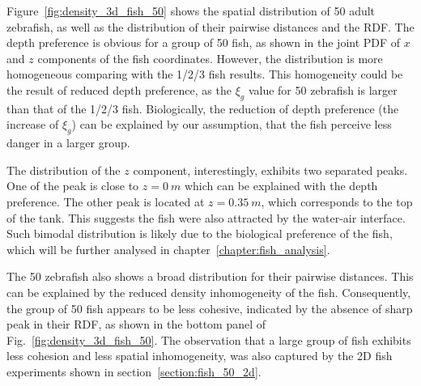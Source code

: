\documentclass[11pt,twoside]{report}
\begin{document}
Figure~\ref{fig:density_3d_fish_50} shows the spatial distribution of 50 adult zebrafish, as well as the distribution of their pairwise distances and the RDF. The depth preference is obvious for a group of 50 fish, as shown in the joint PDF of $x$ and $z$ components of the fish coordinates.
However, the distribution is more homogeneous comparing with the 1/2/3 fish results. This homogeneity could be the result of reduced depth preference, as the $\xi_g$ value for 50 zebrafish is larger than that of the 1/2/3 fish. Biologically, the reduction of depth preference (the increase of $\xi_g$) can be explained by our assumption, that the fish perceive less danger in a larger group.

The distribution of the $z$ component, interestingly, exhibits two separated peaks. One of the peak is close to $z = 0\ m$ which can be explained with the depth preference. The other peak is located at $z = 0.35\ m$, which corresponds to the top of the tank. This suggests the fish were also attracted by the water-air interface. Such bimodal distribution is likely due to the biological preference of the fish, which will be further analysed in chapter~\ref{chapter:fish_analysis}.

The 50 zebrafish also shows a broad distribution for their pairwise distances. This can be explained by the reduced density inhomogeneity of the fish. Consequently, the group of 50 fish appears to be less cohesive, indicated by the absence of sharp peak in their RDF, as shown in the bottom panel of Fig.~\ref{fig:density_3d_fish_50}. The observation that a large group of fish exhibits less cohesion and less spatial inhomogeneity, was also captured by the 2D fish experiments shown in section~\ref{section:fish_50_2d}.
\end{document}
